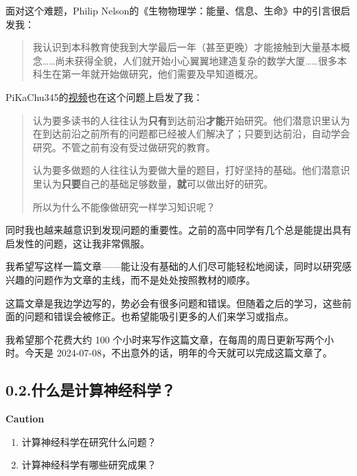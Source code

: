 \documentclass[
]{article}
\begin{document}
面对这个难题，Philip
Nelson的《生物物理学：能量、信息、生命》中的引言很启发我：

\begin{quote}
我认识到本科教育使我到大学最后一年（甚至更晚）才能接触到大量基本概念\ldots\ldots 尚未获得全貌，人们就开始小心翼翼地建造复杂的数学大厦\ldots\ldots 很多本科生在第一年就开始做研究，他们需要及早知道概况。
\end{quote}

PiKaChu345的\href{https://www.bilibili.com/video/BV1qb421n7qK/?spm_id_from=333.999.0.0&vd_source=8acc004888d1e147ebe6458188771c23}{视频}也在这个问题上启发了我：

\begin{quote}
认为要多读书的人往往认为\textbf{只有}到达前沿\textbf{才能}开始研究。他们潜意识里认为在到达前沿之前所有的问题都已经被人们解决了；只要到达前沿，自动学会研究。不管之前有没有受过做研究的教育。

认为要多做题的人往往认为要做大量的题目，打好坚持的基础。他们潜意识里认为\textbf{只要}自己的基础足够数量，\textbf{就}可以做出好的研究。

所以为什么不能像做研究一样学习知识呢？
\end{quote}

同时我也越来越意识到发现问题的重要性。之前的高中同学有几个总是能提出具有启发性的问题，这让我非常佩服。

我希望写这样一篇文章------能让没有基础的人们尽可能轻松地阅读，同时以研究感兴趣的问题作为文章的主线，而不是处处按照教材的顺序。

这篇文章是我边学边写的，势必会有很多问题和错误。但随着之后的学习，这些前面的问题和错误会被修正。也希望能吸引更多的人们来学习或指点。

我希望那个花费大约 100
个小时来写作这篇文章，在每周的周日更新写两个小时。今天是
2024-07-08，不出意外的话，明年的今天就可以完成这篇文章了。

\subsection{0.2.什么是计算神经科学？}\label{02ux4ec0ux4e48ux662fux8ba1ux7b97ux795eux7ecfux79d1ux5b66}

\textbf{Caution}\\

\begin{enumerate}
\def\labelenumi{\arabic{enumi}.}
\item
  计算神经科学在研究什么问题？
\item
  计算神经科学有哪些研究成果？
\end{enumerate}
\end{document}
